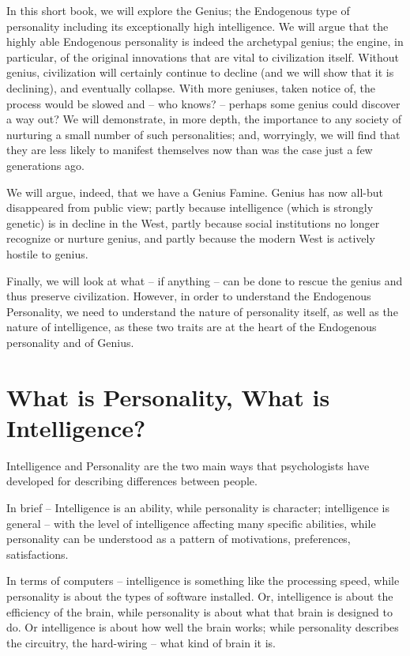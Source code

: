 \documentclass[
]{book}
\begin{document}
In this short book, we will explore the Genius; the Endogenous type of personality including its exceptionally high intelligence. We will argue that the highly able Endogenous personality is indeed the archetypal genius; the engine, in particular, of the original innovations that are vital to civilization itself. Without genius, civilization will certainly continue to decline (and we will show that it is declining), and eventually collapse. With more geniuses, taken notice of, the process would be slowed and -- who knows? -- perhaps some genius could discover a way out?
We will demonstrate, in more depth, the importance to any society of nurturing a small number of such personalities; and, worryingly, we will find that they are less likely to manifest themselves now than was the case just a few generations ago.

We will argue, indeed, that we have a Genius Famine. Genius has now all-but disappeared from public view; partly because intelligence (which is strongly genetic) is in decline in the West, partly because social institutions no longer recognize or nurture genius, and partly because the modern West is actively hostile to genius.

Finally, we will look at what -- if anything -- can be done to rescue the genius and thus preserve civilization.
However, in order to understand the Endogenous Personality, we need to understand the nature of personality itself, as well as the nature of intelligence, as these two traits are at the heart of the Endogenous personality and of Genius.

\hypertarget{what-is-personality-what-is-intelligence}{%
\chapter{What is Personality, What is Intelligence?}\label{what-is-personality-what-is-intelligence}}

Intelligence and Personality are the two main ways that psychologists have developed for describing differences between people.

In brief -- Intelligence is an ability, while personality is character; intelligence is general -- with the level of intelligence affecting many specific abilities, while personality can be understood as a pattern of motivations, preferences, satisfactions.

In terms of computers -- intelligence is something like the processing speed, while personality is about the types of software installed. Or, intelligence is about the efficiency of the brain, while personality is about what that brain is designed to do. Or intelligence is about how well the brain works; while personality describes the circuitry, the hard-wiring -- what kind of brain it is.
\end{document}
